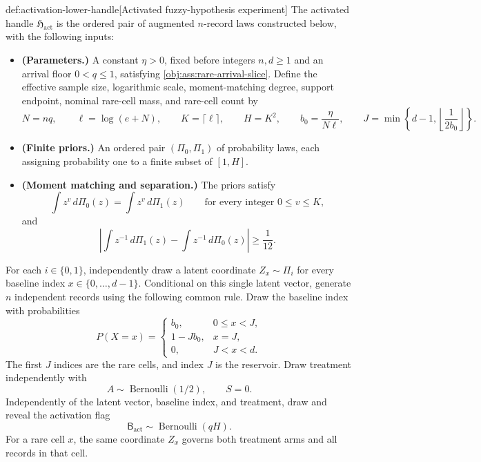 \documentclass[11pt]{article}
\begin{document}
\begin{algorithmv}{def:activation-lower-handle}[Activated fuzzy-hypothesis experiment]
The activated handle \(\mathfrak H_{\mathrm{act}}\) is the ordered pair of augmented \(n\)-record laws constructed below, with the following inputs:
\begin{itemize}
\item \textbf{(Parameters.)} A constant \(\eta>0\), fixed before integers \(n,d\ge1\) and an arrival floor \(0<q\le1\), satisfying \cref{obj:ass:rare-arrival-slice}. Define the effective sample size, logarithmic scale, moment-matching degree, support endpoint, nominal rare-cell mass, and rare-cell count by
\[
N=nq,\qquad
\ell=\log(e+N),\qquad
K=\lceil\ell\rceil,\qquad
H=K^2,\qquad
b_0=\frac{\eta}{N\ell},\qquad
J=\min\left\{d-1,\left\lfloor\frac{1}{2b_0}\right\rfloor\right\}.
\]
\item \textbf{(Finite priors.)} An ordered pair \((\Pi_0,\Pi_1)\) of probability laws, each assigning probability one to a finite subset of \([1,H]\).
\item \textbf{(Moment matching and separation.)} The priors satisfy
\[
\int z^v\,d\Pi_0(z)=\int z^v\,d\Pi_1(z)
\qquad\text{for every integer }0\le v\le K,
\]
and
\[
\left|\int z^{-1}\,d\Pi_1(z)-\int z^{-1}\,d\Pi_0(z)\right|
\ge\frac1{12}.
\]
\end{itemize}

For each \(i\in\{0,1\}\), independently draw a latent coordinate \(Z_x\sim\Pi_i\) for every baseline index \(x\in\{0,\ldots,d-1\}\). Conditional on this single latent vector, generate \(n\) independent records using the following common rule. Draw the baseline index with probabilities
\[
P(X=x)=
\begin{cases}
b_0,&0\le x<J,\\
1-Jb_0,&x=J,\\
0,&J<x<d.
\end{cases}
\]
The first \(J\) indices are the rare cells, and index \(J\) is the reservoir. Draw treatment independently with
\[
A\sim\operatorname{Bernoulli}(1/2),
\qquad S=0.
\]
Independently of the latent vector, baseline index, and treatment, draw and reveal the activation flag
\[
\mathsf B_{\mathrm{act}}\sim\operatorname{Bernoulli}(qH).
\]
For a rare cell \(x\), the same coordinate \(Z_x\) governs both treatment arms and all records in that cell.


\end{algorithmv}
\end{document}
